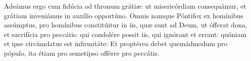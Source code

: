 Adeámus ergo cum fidúcia ad thronum grátiæ:
	ut misericórdiam consequámur, et grátiam inveniámus in auxílio opportúno.
Omnis namque Póntifex ex homínibus assúmptus,
	pro homínibus constitúitur in iis, quæ sunt ad Deum,
	ut ófferat dona, et sacrifícia pro peccátis:
	qui condolére possit iis, qui ignórant et errant:
	quóniam et ipse circúmdatus est infirmitáte:
Et proptérea debet quemádmodum pro pópulo,
	ita étiam pro semetípso offérre pro peccátis.
